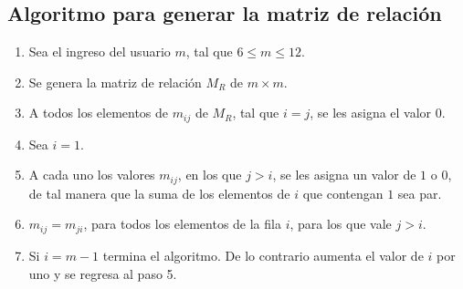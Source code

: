 \documentclass[12pt]{article}
\begin{document}
\subsection{Algoritmo para generar la matriz de relaci\'{o}n}
\begin{enumerate}
\item Sea el ingreso del usuario $m$, tal que $6\leq m\leq 12$.
\item Se genera la matriz de relaci\'{o}n $M_{R}$ de $m \times m$.
\item A todos los elementos de $m_{ij}$ de $M_{R}$, tal que $i=j$, se les asigna el valor $0$.
\item Sea $i=1$.
\item A cada uno los valores $m_{ij}$, en los que $j>i$, se les asigna un valor de $1$ o $0$, de tal manera que la suma de los elementos de $i$ que contengan $1$ sea par.
\item $m_{ij}=m_{ji}$, para todos los elementos de la fila $i$, para los que vale $j>i$.
\item Si $i=m-1$ termina el algoritmo. De lo contrario aumenta el valor de $i$ por uno y se regresa al paso 5.
\end{enumerate}
\end{document}
